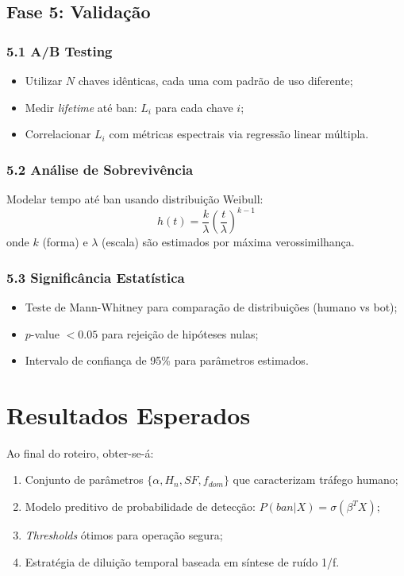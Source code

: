 \documentclass[12pt,openright,oneside,a4paper]{abntex2}
\begin{document}
\section{Fase 5: Validação}

\subsection{5.1 A/B Testing}
\begin{itemize}
    \item Utilizar $N$ chaves idênticas, cada uma com padrão de uso diferente;
    \item Medir \textit{lifetime} até ban: $L_i$ para cada chave $i$;
    \item Correlacionar $L_i$ com métricas espectrais via regressão linear múltipla.
\end{itemize}

\subsection{5.2 Análise de Sobrevivência}

Modelar tempo até ban usando distribuição Weibull:
$$h(t) = \frac{k}{\lambda} \left(\frac{t}{\lambda}\right)^{k-1}$$
onde $k$ (forma) e $\lambda$ (escala) são estimados por máxima verossimilhança.

\subsection{5.3 Significância Estatística}
\begin{itemize}
    \item Teste de Mann-Whitney para comparação de distribuições (humano vs bot);
    \item $p$-value $< 0.05$ para rejeição de hipóteses nulas;
    \item Intervalo de confiança de 95\% para parâmetros estimados.
\end{itemize}

\chapter{Resultados Esperados}

Ao final do roteiro, obter-se-á:

\begin{enumerate}
    \item Conjunto de parâmetros $\{\alpha, H_n, SF, f_{dom}\}$ que caracterizam tráfego humano;
    \item Modelo preditivo de probabilidade de detecção: $P(ban | X) = \sigma(\beta^T X)$;
    \item \textit{Thresholds} ótimos para operação segura;
    \item Estratégia de diluição temporal baseada em síntese de ruído 1/f.
\end{enumerate}
\end{document}
